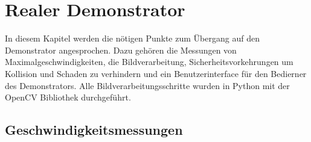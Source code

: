 \chapter{Realer Demonstrator}  
\label{ch:realer demonstrator}
In diesem Kapitel werden die nötigen Punkte zum Übergang auf den Demonstrator angesprochen. Dazu gehören die Messungen von Maximalgeschwindigkeiten, die Bildverarbeitung, Sicherheitsvorkehrungen um Kollision und Schaden zu verhindern und ein Benutzerinterface für den Bedierner des Demonstrators. Alle Bildverarbeitungsschritte wurden in Python mit der OpenCV Bibliothek durchgeführt.

\section{Geschwindigkeitsmessungen}
\label{sect:geschwindigkeitsmessungen}

